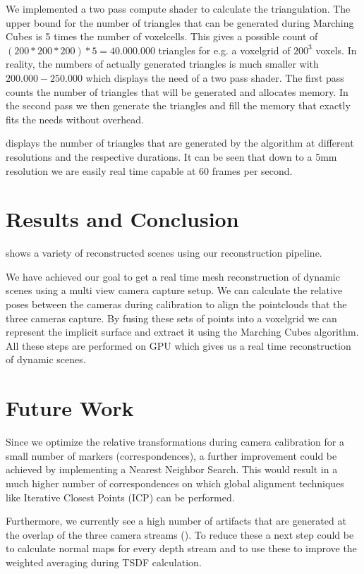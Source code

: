 \documentclass[10pt,twocolumn,letterpaper]{article}
\begin{document}
We implemented a two pass \opengl{} compute shader to calculate the triangulation. The upper bound for the number of triangles that can be generated during Marching Cubes is 5 times the number of voxelcells. This gives a possible count of $(200 * 200 * 200) * 5 = 40.000.000$ triangles for e.g. a voxelgrid of $200^3$ voxels. In reality, the numbers of actually generated triangles is much smaller with $200.000 - 250.000$ which displays the need of a two pass shader. The first pass counts the number of triangles that will be generated and allocates memory. In the second pass we then generate the triangles and fill the memory that exactly fits the needs without overhead.

 displays the number of triangles that are generated by the algorithm at different resolutions and the respective durations. It can be seen that down to a 5mm resolution we are easily real time capable at 60 frames per second.

\section{Results and Conclusion}
 shows a variety of reconstructed scenes using our reconstruction pipeline.

We have achieved our goal to get a real time mesh reconstruction of dynamic scenes using a multi view camera capture setup. We can calculate the relative poses between the cameras during calibration to align the pointclouds that the three cameras capture. By fusing these sets of points into a voxelgrid we can represent the implicit surface and extract it using the Marching Cubes algorithm. All these steps are performed on GPU which gives us a real time reconstruction of dynamic scenes.

\section{Future Work}
Since we optimize the relative transformations during camera calibration for a small number of markers (correspondences), a further improvement could be achieved by implementing a Nearest Neighbor Search. This would result in a much higher number of correspondences on which global alignment techniques like Iterative Closest Points (ICP) can be performed.

Furthermore, we currently see a high number of artifacts that are generated at the overlap of the three camera streams (). To reduce these a next step could be to calculate normal maps for every depth stream and to use these to improve the weighted averaging during TSDF calculation.
\end{document}
